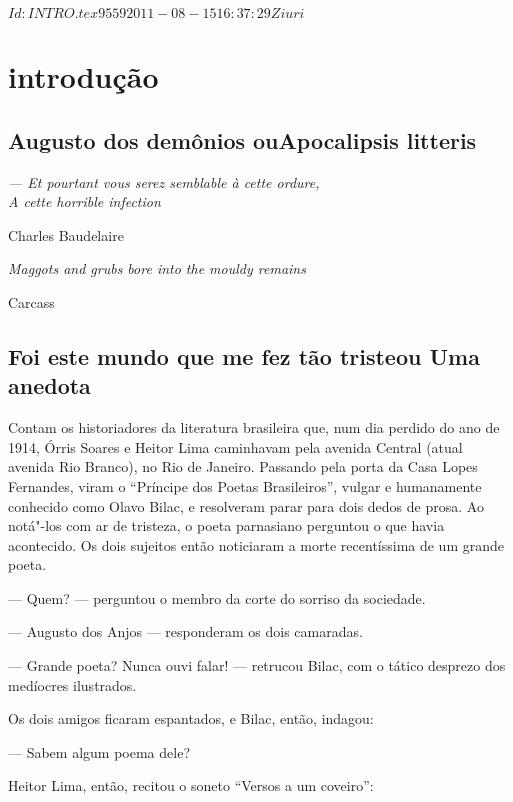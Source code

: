 \SVN $Id: INTRO.tex 9559 2011-08-15 16:37:29Z iuri $
\chapter[Introdução, por Fabiano Calixto]{introdução}

\section[Augusto dos demônios ou Apocalipsis litteris]{Augusto dos demônios
ou\break Apocalipsis litteris}


\epigraph{\itshape
--- Et pourtant vous serez semblable à cette ordure,\\
A cette horrible infection}{Charles Baudelaire}

\epigraph{\itshape
Maggots and grubs bore into the mouldy remains}{Carcass}{}

\section[Foi este mundo que me fez tão triste ou Uma anedota]{Foi este mundo que me fez tão triste\break ou Uma anedota}

Contam os historiadores da literatura brasileira que, num dia
perdido do ano de 1914, Órris Soares e Heitor Lima caminhavam pela
avenida Central (atual avenida Rio Branco), no Rio de Janeiro. Passando
pela porta da Casa Lopes Fernandes, viram o “Príncipe dos Poetas
Brasileiros”, vulgar e humanamente conhecido como Olavo Bilac, e
resolveram parar para dois dedos de prosa. Ao notá"-los com ar de
tristeza, o poeta parnasiano perguntou o que havia acontecido. Os dois
sujeitos então noticiaram a morte recentíssima de um grande poeta.

--- Quem? --- perguntou o membro da corte do sorriso da sociedade.

--- Augusto dos Anjos --- responderam os dois camaradas.

--- Grande poeta? Nunca ouvi falar! --- retrucou Bilac, com o tático
desprezo dos medíocres ilustrados.

Os dois amigos ficaram espantados, e Bilac, então, indagou: 

--- Sabem algum poema dele?

Heitor Lima, então, recitou o soneto “Versos a um coveiro”:

